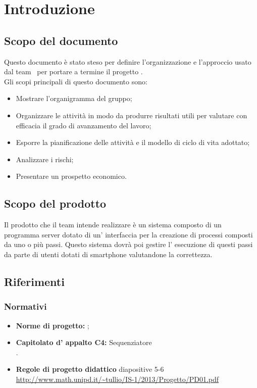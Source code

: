 \section{Introduzione}
\subsection{Scopo del documento}
Questo documento è stato steso per definire l'organizzazione e l'approccio usato dal team \gruppo ~per portare a termine il progetto \progetto. \\
Gli scopi principali di questo documento sono:
\begin{itemize}
  \item Mostrare l'organigramma del gruppo;
  \item Organizzare le attività in modo da produrre risultati utili per 
valutare con efficacia il grado di avanzamento del lavoro;
  \item	Esporre la pianificazione delle attività e il modello di ciclo di vita adottato;
  \item Analizzare i rischi;
  \item Presentare un prospetto economico.
\end{itemize}

\subsection{Scopo del prodotto}
Il prodotto che il team \gruppo intende realizzare è un sistema composto di un programma server dotato di un' interfaccia per la creazione di processi composti da uno o più passi. Questo sistema dovrà poi gestire l' esecuzione di questi passi da parte di utenti dotati di smartphone valutandone la correttezza.\\

\subsection{Riferimenti}

\subsubsection{Normativi}
\begin{itemize}
	\item \textbf{Norme di progetto:} \infoNDP ;
	\item \textbf{Capitolato d' appalto C4:} Sequenziatore\\ \capitolato .
	\item \textbf{Regole di progetto didattico} diapositive 5-6 \url{http://www.math.unipd.it/~tullio/IS-1/2013/Progetto/PD01.pdf} 
\end{itemize}

